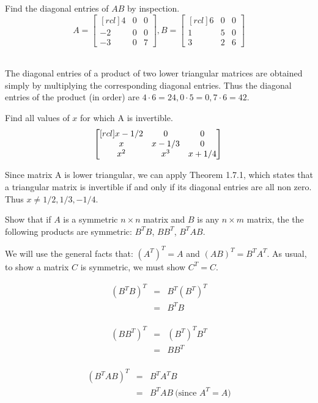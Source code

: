 \ii  Find the diagonal entries of $AB$ by inspection.\\
$$A = 
\begin{bmatrix}[rcl]
4&0&0\\
-2&0&0\\
-3&0&7
\end{bmatrix},
B = 
\begin{bmatrix}[rcl]
6&0&0\\
1&5&0\\
3&2&6
\end{bmatrix}
$$
\begin{solution}\ \\
The diagonal entries of a product of two lower triangular matrices are obtained simply by multiplying the corresponding diagonal entries. Thus the diagonal entries of the product (in order) are $4\cdot 6=24, 0\cdot 5=0, 7\cdot 6=42$. 
\end{solution}

\ii Find all values of $x$ for which A is invertible.\\
$$
\begin{bmatrix}[rcl]
x - 1/2&0&0\\
x&x-1/3&0\\
x^2&x^3&x+1/4
\end{bmatrix}\\
$$
\begin{solution}
Since matrix A is lower triangular, we can apply Theorem 1.7.1, which states that a triangular matrix is invertible if and only if its diagonal entries are all non zero. Thus $x \neq 1/2, 1/3, -1/4$.
\end{solution}

\ii Show that if $A$ is a symmetric $n\times n$ matrix and $B$ is any $n\times m$ matrix, the the following products are symmetric: $B^TB$, $BB^T$, $B^TAB$.
\\
\begin{solution}
We will use the general facts that: $(A^T)^T = A$ and $(AB)^T = B^TA^T$. As usual, to show a matrix $C$ is symmetric, we must show $C^T=C$. 

\begin{eqnarray*}
(B^TB)^T&=&B^T(B^T)^T\\
&=& B^TB
\end{eqnarray*}\\
\begin{eqnarray*}
 (BB^T)^T&=& (B^T)^TB^T\\
&=&BB^T
\end{eqnarray*}\\
\begin{eqnarray*}
(B^TAB)^T&=& B^TA^TB\\
&=& B^TAB \ \text{(since $A^T=A$)}
\end{eqnarray*}
\end{solution}

